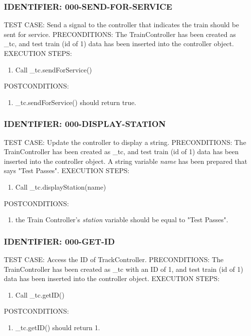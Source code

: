 \documentclass{scrreprt}
\begin{document}
\subsubsection{IDENTIFIER: 000-SEND-FOR-SERVICE}
TEST CASE: Send a signal to the controller that indicates the train should be sent for service.
PRECONDITIONS: The TrainController has been created as _tc, and test train (id of 1) data has been inserted into the controller object.
EXECUTION STEPS:
\begin{enumerate}
	\item Call _tc.sendForService()
\end{enumerate}
POSTCONDITIONS:
\begin{enumerate}
	\item _tc.sendForService() should return true.
\end{enumerate}

\subsubsection{IDENTIFIER: 000-DISPLAY-STATION}
TEST CASE: Update the controller to display a string.
PRECONDITIONS: The TrainController has been created as _tc, and test train (id of 1) data has been inserted into the controller object. A string variable \textit{name} has been prepared that says "Test Passes".
EXECUTION STEPS:
\begin{enumerate}
	\item Call _tc.displayStation(name)
\end{enumerate}
POSTCONDITIONS:
\begin{enumerate}
	\item the Train Controller's \textit{station} variable should be equal to "Test Passes".
\end{enumerate}

\subsubsection{IDENTIFIER: 000-GET-ID}
TEST CASE: Access the ID of TrackController.
PRECONDITIONS: The TrainController has been created as _tc with an ID of 1, and test train (id of 1) data has been inserted into the controller object.
EXECUTION STEPS:
\begin{enumerate}
	\item Call _tc.getID()
\end{enumerate}
POSTCONDITIONS:
\begin{enumerate}
	\item _tc.getID() should return 1.
\end{enumerate}
\end{document}
